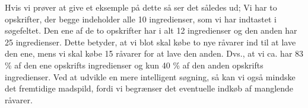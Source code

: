 Hvis vi prøver at give et eksemple på dette så ser det således ud; Vi har to opskrifter, der begge indeholder alle 10 ingredienser, som vi har indtastet i søgefeltet. Den ene af de to opskrifter har i alt 12 ingredienser og den anden har 25 ingredienser. Dette betyder, at vi blot skal købe to nye råvarer ind til at lave den ene, mens vi skal købe 15 råvarer for at lave den anden. Dvs., at vi ca. har 83 \% af den ene opskrifts ingredienser og kun 40 \% af den anden opskrifts ingredienser. Ved at udvikle en mere intelligent søgning, så kan vi også mindske det fremtidige madspild, fordi vi begrænser det eventuelle indkøb af manglende råvarer.